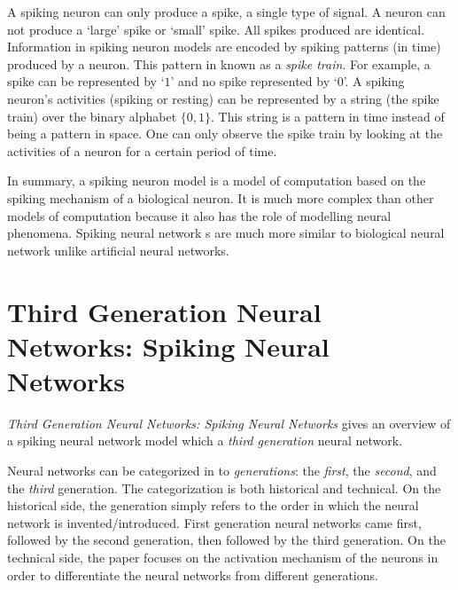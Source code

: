 \documentclass[12pt,A4]{article}
\begin{document}
A spiking neuron can only produce a spike, a single type of signal. A neuron can not produce a 
`large' spike or `small' spike. All spikes produced are identical. Information in spiking neuron
models are encoded by spiking patterns (in time) produced by a neuron. This pattern in known as
a \emph{spike train}. For example, a spike can be represented by `$1$' and no spike represented by
`$0$'. A spiking neuron's activities (spiking or resting) can be represented by a string (the spike
train) over the binary alphabet $\{0,1\}$. This string is a pattern in time instead of being a
pattern in space. One can only observe the spike train by looking at the activities of a neuron for
a certain period of time.

In summary, a spiking neuron model is  a model of computation based on the spiking mechanism of a
biological neuron. It is much more complex than other models of computation because it also has the
role of modelling neural phenomena. Spiking neural network s are much more similar to biological 
neural network unlike artificial neural networks.


\section*{Third Generation Neural Networks: Spiking Neural Networks}


\emph{Third Generation Neural Networks: Spiking Neural Networks} \cite{ghosh-dastidar-2009-snn} 
gives an overview of a spiking neural network model which a \emph{third generation} neural network.

Neural networks can be categorized in to \emph{generations}: the \emph{first}, the \emph{second}, 
and the \emph{third} generation. The categorization is both historical and technical. On the 
historical side, the generation simply refers to the order in which the neural network is
invented/introduced. First generation neural networks came first, followed by the second generation,
then followed by the third generation. On the technical side, the paper focuses on the activation 
mechanism of the neurons in order to differentiate the neural networks from different generations.
\end{document}
